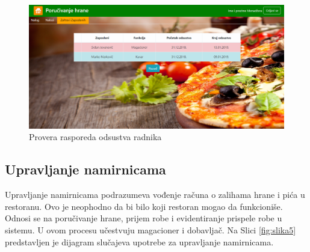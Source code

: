 \vspace{5cm}
\begin{figure}[!h]
    \includegraphics[width=1\textwidth]{slike/menadzer_proveraStanja.PNG}
    \caption{Provera rasporeda odsustva radnika} %
    \label{fig:slika_raspored}
\end{figure}
\newpage
 \subsection{Upravljanje namirnicama}
 Upravljanje namirnicama podrazumeva vođenje računa o zalihama hrane i pića u restoranu. Ovo je neophodno da bi bilo koji restoran mogao da funkcioniše. Odnosi se na poručivanje hrane, prijem robe i evidentiranje prispele robe u sistemu. U ovom procesu učestvuju magacioner i dobavljač.
 Na Slici \ref{fig:slika5} predstavljen je dijagram slučajeva upotrebe za upravljanje namirnicama.
 
